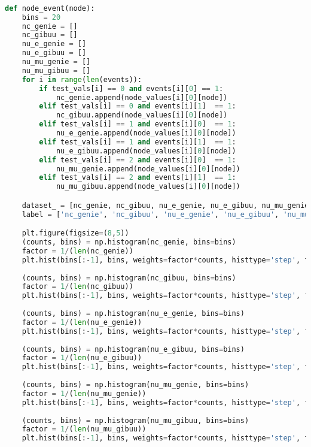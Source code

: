 \begin{lstlisting}[language=Python]
    
    
def node_event(node):
    bins = 20
    nc_genie = []
    nc_gibuu = []
    nu_e_genie = []
    nu_e_gibuu = []
    nu_mu_genie = []
    nu_mu_gibuu = []
    for i in range(len(events)):
        if test_vals[i] == 0 and events[i][0] == 1:
            nc_genie.append(node_values[i][0][node])
        elif test_vals[i] == 0 and events[i][1]  == 1:
            nc_gibuu.append(node_values[i][0][node])
        elif test_vals[i] == 1 and events[i][0]  == 1:
            nu_e_genie.append(node_values[i][0][node])
        elif test_vals[i] == 1 and events[i][1]  == 1:
            nu_e_gibuu.append(node_values[i][0][node])
        elif test_vals[i] == 2 and events[i][0]  == 1:
            nu_mu_genie.append(node_values[i][0][node])
        elif test_vals[i] == 2 and events[i][1]  == 1:
            nu_mu_gibuu.append(node_values[i][0][node])

    dataset_ = [nc_genie, nc_gibuu, nu_e_genie, nu_e_gibuu, nu_mu_genie, nu_mu_gibuu]
    label = ['nc_genie', 'nc_gibuu', 'nu_e_genie', 'nu_e_gibuu', 'nu_mu_genie', 'nu_mu_gibuu']

    plt.figure(figsize=(8,5))
    (counts, bins) = np.histogram(nc_genie, bins=bins)
    factor = 1/(len(nc_genie))
    plt.hist(bins[:-1], bins, weights=factor*counts, histtype='step', fill=False, label='nc_genie', linestyle=('solid'),color=('g'))
    
    (counts, bins) = np.histogram(nc_gibuu, bins=bins)
    factor = 1/(len(nc_gibuu))
    plt.hist(bins[:-1], bins, weights=factor*counts, histtype='step', fill=False, label='nc_gibuu', linestyle=('dashed'),color=('g'))
    
    (counts, bins) = np.histogram(nu_e_genie, bins=bins)
    factor = 1/(len(nu_e_genie))
    plt.hist(bins[:-1], bins, weights=factor*counts, histtype='step', fill=False, label='nu_e_genie', linestyle=('solid'),color=('r'))
    
    (counts, bins) = np.histogram(nu_e_gibuu, bins=bins)
    factor = 1/(len(nu_e_gibuu))
    plt.hist(bins[:-1], bins, weights=factor*counts, histtype='step', fill=False, label='nu_e_gibuu', linestyle=('dashed'),color=('r'))
    
    (counts, bins) = np.histogram(nu_mu_genie, bins=bins)
    factor = 1/(len(nu_mu_genie))
    plt.hist(bins[:-1], bins, weights=factor*counts, histtype='step', fill=False, label='nu_mu_genie', linestyle=('solid'),color=('b'))
    
    (counts, bins) = np.histogram(nu_mu_gibuu, bins=bins)
    factor = 1/(len(nu_mu_gibuu))
    plt.hist(bins[:-1], bins, weights=factor*counts, histtype='step', fill=False, label='nu_mu_gibuu', linestyle=('dashed'),color=('b'))


\end{lstlisting}
